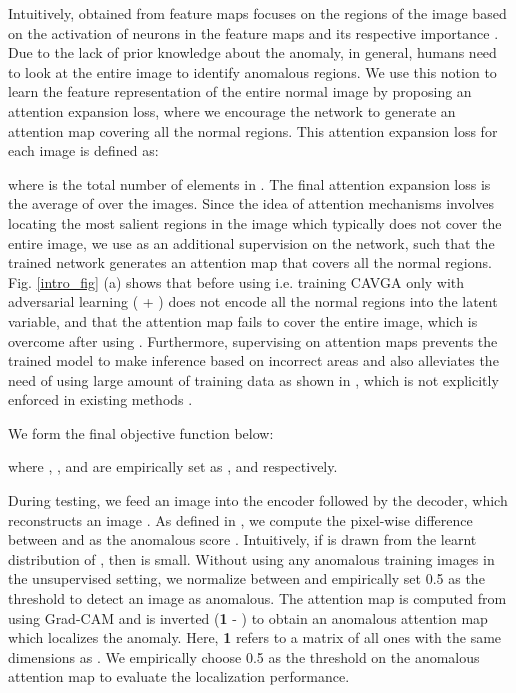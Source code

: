 \documentclass[runningheads]{llncs}
\begin{document}
Intuitively,  obtained from feature maps focuses on the regions of the image based on the activation of neurons in the feature maps and its respective importance \cite{zhou2016learning,zagoruyko2016paying}. Due to the lack of prior knowledge about the anomaly, in general, humans need to look at the entire image to identify anomalous regions. We use this notion to learn the feature representation of the entire normal image by proposing an attention expansion loss, where we encourage the network to generate an attention map covering all the normal regions. This attention expansion loss for each image  is defined as:


where  is the total number of elements in . The final attention expansion loss  is the average of  over the  images. Since the idea of attention mechanisms involves locating the most salient regions in the image \cite{Li_2019_CVPR} which typically does not cover the entire image, we use  as an additional supervision on the network, such that the trained network generates an attention map that covers all the normal regions. Fig. \ref{intro_fig}  (a) shows that before using  i.e. training CAVGA only with adversarial learning ( + ) does not encode all the normal regions into the latent variable, and that the attention map fails to cover the entire image, which is overcome after using . Furthermore, supervising on attention maps prevents the trained model to make inference based on incorrect areas and also alleviates the need of using large amount of training data as shown in \cite{li2018tell}, which is not explicitly enforced in existing methods \cite{sabokrou2018avid, akcay2018ganomaly, bergmann2018improving}.

We form the final objective function  below:

where , , and  are empirically set as , and  respectively.


During testing, we feed an image  into the encoder followed by the decoder, which reconstructs an image . As defined in \cite{schlegl2017unsupervised}, we compute the pixel-wise difference between  and  as the anomalous score . Intuitively, if  is drawn from the learnt distribution of , then  is small. Without using any anomalous training images in the unsupervised setting, we normalize  between  and empirically set 0.5 as the threshold to detect an image as anomalous. The attention map  is computed from  using Grad-CAM and is inverted (\textbf{1} - ) to obtain an anomalous attention map which localizes the anomaly. Here, \textbf{1} refers to a matrix of all ones with the same dimensions as . We empirically choose 0.5 as the threshold on the anomalous attention map to evaluate the localization performance. 
\end{document}
